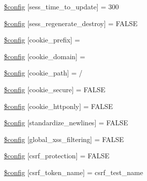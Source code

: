 \begin{DoxyCompactItemize}
\item 
\mbox{\hyperlink{application_2config_2config_8php_a2d88d1952ab601090523e0f8d4676578}{\$config}} \mbox{[}\textquotesingle{}sess\+\_\+time\+\_\+to\+\_\+update\textquotesingle{}\mbox{]} = 300
\item 
\mbox{\hyperlink{application_2config_2config_8php_a4d469f30b7e3539f5a90da887cc05be9}{\$config}} \mbox{[}\textquotesingle{}sess\+\_\+regenerate\+\_\+destroy\textquotesingle{}\mbox{]} = F\+A\+L\+SE
\item 
\mbox{\hyperlink{application_2config_2config_8php_a4a9435423f9b07e56b82b4a0d07a23d9}{\$config}} \mbox{[}\textquotesingle{}cookie\+\_\+prefix\textquotesingle{}\mbox{]} = \textquotesingle{}\textquotesingle{}
\item 
\mbox{\hyperlink{application_2config_2config_8php_a73a43940ec583de5bcdb19c239b4510c}{\$config}} \mbox{[}\textquotesingle{}cookie\+\_\+domain\textquotesingle{}\mbox{]} = \textquotesingle{}\textquotesingle{}
\item 
\mbox{\hyperlink{application_2config_2config_8php_a176dd309a2f62188ff78be8a2b98eaaf}{\$config}} \mbox{[}\textquotesingle{}cookie\+\_\+path\textquotesingle{}\mbox{]} = \textquotesingle{}/\textquotesingle{}
\item 
\mbox{\hyperlink{application_2config_2config_8php_adbf726991c50cda563404e5162b11977}{\$config}} \mbox{[}\textquotesingle{}cookie\+\_\+secure\textquotesingle{}\mbox{]} = F\+A\+L\+SE
\item 
\mbox{\hyperlink{application_2config_2config_8php_adad0e1a96179de1af337c7b88104e27e}{\$config}} \mbox{[}\textquotesingle{}cookie\+\_\+httponly\textquotesingle{}\mbox{]} = F\+A\+L\+SE
\item 
\mbox{\hyperlink{application_2config_2config_8php_a9e3f88fcf538f3a5fc535968b36e0193}{\$config}} \mbox{[}\textquotesingle{}standardize\+\_\+newlines\textquotesingle{}\mbox{]} = F\+A\+L\+SE
\item 
\mbox{\hyperlink{application_2config_2config_8php_ab45064f0f597502748a1f241fc7ca8eb}{\$config}} \mbox{[}\textquotesingle{}global\+\_\+xss\+\_\+filtering\textquotesingle{}\mbox{]} = F\+A\+L\+SE
\item 
\mbox{\hyperlink{application_2config_2config_8php_afa3283fe6e347ec07dc24a3bddd24b9e}{\$config}} \mbox{[}\textquotesingle{}csrf\+\_\+protection\textquotesingle{}\mbox{]} = F\+A\+L\+SE
\item 
\mbox{\hyperlink{application_2config_2config_8php_ac474c904aeb13f7dc1cb5430a8fc9e63}{\$config}} \mbox{[}\textquotesingle{}csrf\+\_\+token\+\_\+name\textquotesingle{}\mbox{]} = \textquotesingle{}csrf\+\_\+test\+\_\+name\textquotesingle{}

\end{DoxyCompactItemize}

